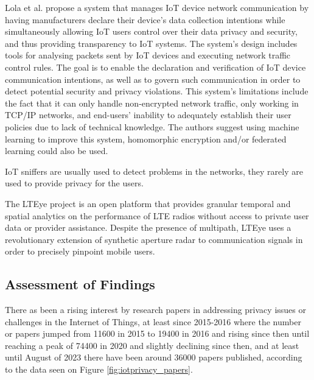 Lola et al. \cite{electronics12122589} propose a system that manages IoT
device network communication by having manufacturers declare their device's
data collection intentions while simultaneously allowing IoT users control
over their data privacy and security, and thus providing transparency to
IoT systems. The system's design includes tools for analysing packets sent
by IoT devices and executing network traffic control rules. The goal is
to enable the declaration and verification of IoT device communication
intentions, as well as to govern such communication in order to detect
potential security and privacy violations. This system's limitations include
the fact that it can only handle non-encrypted network traffic, only working
in TCP/IP networks, and end-users' inability to adequately establish
their user policies due to lack of technical knowledge. The authors
suggest using machine learning to improve this system, homomorphic encryption
and/or federated learning could also be used.

IoT sniffers are usually used to detect problems in the networks, they rarely
are used to provide privacy for the users.

The LTEye project \cite{KumarLTE} is an open platform that provides granular
temporal and spatial analytics on the performance of LTE radios without access
to private user data or provider assistance. Despite the presence of multipath,
LTEye uses a revolutionary extension of synthetic aperture radar to communication
signals in order to precisely pinpoint mobile users.

\subsection{Assessment of Findings}

There as been a rising interest by research papers in addressing privacy
issues or challenges in the Internet of Things, at least since 2015-2016
where the number or papers jumped from 11600 in 2015 to 19400 in 2016
and rising since then until reaching a peak of 74400 in 2020 and slightly
declining since then, and at least until August of 2023 there have been
around 36000 papers published, according to the data seen on Figure \ref{fig:iotprivacy_papers}.

